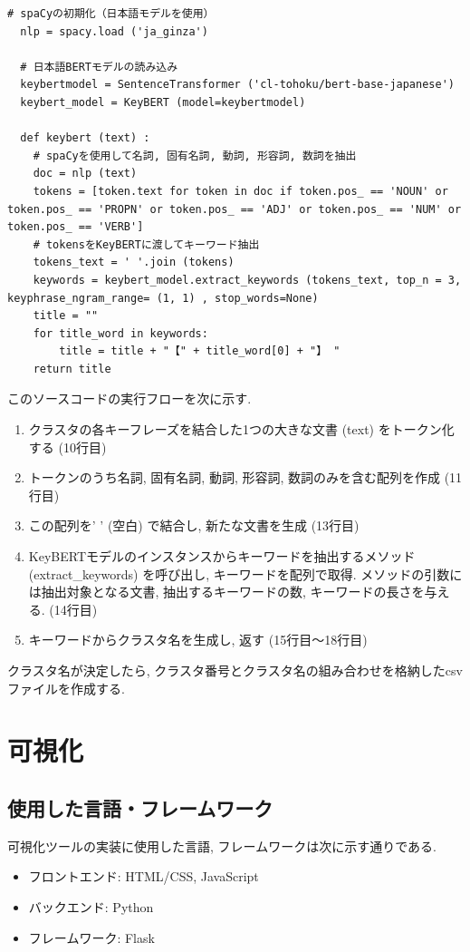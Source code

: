 \begin{lstlisting}[caption=keybert関数, label=keybert]
  # spaCyの初期化（日本語モデルを使用）
  nlp = spacy.load ('ja_ginza') 

  # 日本語BERTモデルの読み込み
  keybertmodel = SentenceTransformer ('cl-tohoku/bert-base-japanese') 
  keybert_model = KeyBERT (model=keybertmodel) 

  def keybert (text) :
    # spaCyを使用して名詞, 固有名詞, 動詞, 形容詞, 数詞を抽出
    doc = nlp (text) 
    tokens = [token.text for token in doc if token.pos_ == 'NOUN' or token.pos_ == 'PROPN' or token.pos_ == 'ADJ' or token.pos_ == 'NUM' or token.pos_ == 'VERB']
    # tokensをKeyBERTに渡してキーワード抽出
    tokens_text = ' '.join (tokens) 
    keywords = keybert_model.extract_keywords (tokens_text, top_n = 3, keyphrase_ngram_range= (1, 1) , stop_words=None) 
    title = ""
    for title_word in keywords:
        title = title + "【" + title_word[0] + "】 "
    return title
\end{lstlisting}

このソースコードの実行フローを次に示す. 

\begin{enumerate}
  \item クラスタの各キーフレーズを結合した1つの大きな文書 (text) をトークン化する (10行目)
  \item トークンのうち名詞, 固有名詞, 動詞, 形容詞, 数詞のみを含む配列を作成 (11行目)
  \item この配列を' ' (空白) で結合し, 新たな文書を生成 (13行目)
  \item KeyBERTモデルのインスタンスからキーワードを抽出するメソッド (extract\_keywords) を呼び出し, キーワードを配列で取得. メソッドの引数には抽出対象となる文書, 抽出するキーワードの数, キーワードの長さを与える. (14行目)
  \item キーワードからクラスタ名を生成し, 返す (15行目〜18行目)
\end{enumerate}

クラスタ名が決定したら, クラスタ番号とクラスタ名の組み合わせを格納したcsvファイルを作成する. 


\section{可視化}\label{display}
\subsection{使用した言語・フレームワーク}
可視化ツールの実装に使用した言語, フレームワークは次に示す通りである. 
\begin{itemize}
    \item フロントエンド: HTML/CSS, JavaScript
    \item バックエンド: Python
    \item フレームワーク: Flask
\end{itemize}


